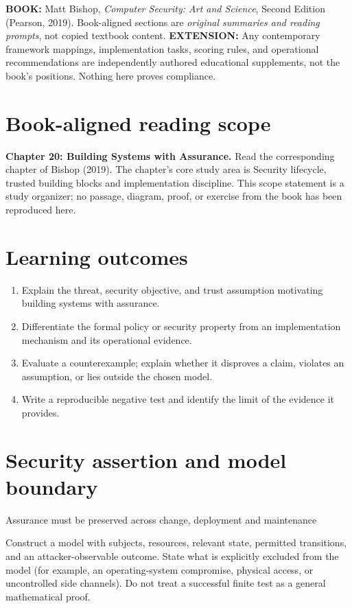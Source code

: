 \documentclass[10pt,letterpaper]{article}
\begin{document}
\makedoctocpage
\begin{notebox}
\textbf{BOOK:} Matt Bishop, \emph{Computer Security: Art and Science}, Second Edition (Pearson, 2019). Book-aligned sections are \emph{original summaries and reading prompts}, not copied textbook content.
\textbf{EXTENSION:} Any contemporary framework mappings, implementation tasks, scoring rules, and operational recommendations are independently authored educational supplements, not the book's positions. Nothing here proves compliance.
\end{notebox}
\section{Book-aligned reading scope}
\textbf{Chapter 20: Building Systems with Assurance.} Read the corresponding chapter of Bishop (2019). The chapter's core study area is Security lifecycle, trusted building blocks and implementation discipline. This scope statement is a study organizer; no passage, diagram, proof, or exercise from the book has been reproduced here.
\section{Learning outcomes}
\begin{enumerate}
\item Explain the threat, security objective, and trust assumption motivating building systems with assurance.
\item Differentiate the formal policy or security property from an implementation mechanism and its operational evidence.
\item Evaluate a counterexample; explain whether it disproves a claim, violates an assumption, or lies outside the chosen model.
\item Write a reproducible negative test and identify the limit of the evidence it provides.
\end{enumerate}
\section{Security assertion and model boundary}
\begin{infobox}
Assurance must be preserved across change, deployment and maintenance
\end{infobox}
Construct a model with subjects, resources, relevant state, permitted transitions, and an attacker-observable outcome. State what is explicitly excluded from the model (for example, an operating-system compromise, physical access, or uncontrolled side channels). Do not treat a successful finite test as a general mathematical proof.
\end{document}
